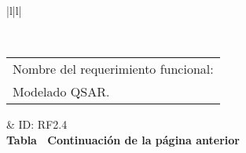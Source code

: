 \begin{longtable}{|l|l|}
\caption{Requerimiento funcional 2.4}
\label{RF2_4}\\
\hline
\begin{tabular}[c]{@{}l@{}}Nombre del requerimiento funcional:\\ Modelado QSAR.\end{tabular}                                                                                                                                                                                 & ID: RF2.4                                                                                                                                                                                                               \\ \hline
\endfirsthead
%
%
{{\bfseries Tabla \thetable\ Continuación de la página anterior}} \\
\endhead
%
                                                                                                                                                                                                                                                                                                                                                                                                                                 \\ \hline
{}                                                                                                                                                                                                                                                                                                                                                                                                                       \\ \hline
{}                                                                                                                                                                                                                                                                                                                                                                                                                                                            \\ \hline

\end{longtable}
